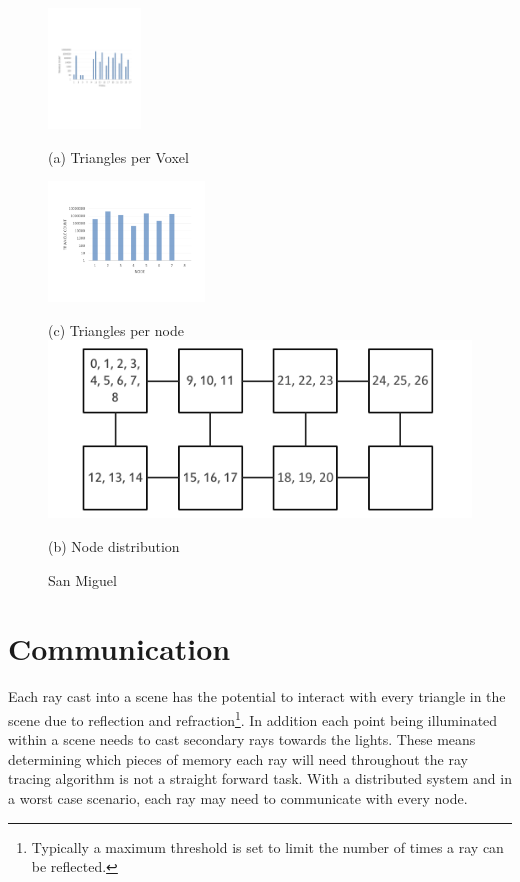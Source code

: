 \begin{figure}[!htb]
  \includegraphics[height=3.2cm]{drawings/VoxelDistribution.pdf}
  
  (a) Triangles per Voxel
  
  \includegraphics[height=3.2cm]{drawings/DataDistribution.pdf}
  
  (c) Triangles per node  
\endminipage\hfill
{}
  \includegraphics[width=\linewidth]{drawings/NodeDistribution.pdf}  
  
  (b) Node distribution  
\endminipage
\caption{San Miguel}
\label{fig:san_miguel_data}
\end{figure}


\section{Communication} 
\label{sec:communication}
Each ray cast into a scene has the potential to interact with every triangle in
the scene due to reflection and refraction\footnote{ %
  Typically a maximum threshold is set to limit the number of times a ray
  can be reflected. 
}.  In addition each point being illuminated within a scene needs to cast 
secondary rays towards the lights.  These means determining which pieces of 
memory each ray will need throughout the ray tracing algorithm is not a straight
forward task.  With a distributed system and in a worst case scenario, each ray 
may need to communicate with every node.  


